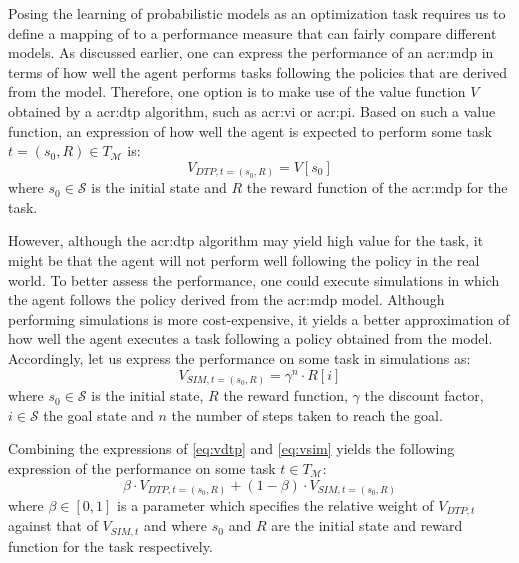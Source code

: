 Posing the learning of probabilistic models as an optimization task requires us to define a mapping of  to a performance measure that can fairly compare different models.
As discussed earlier, one can express the performance of an \acrshort{acr:mdp} in terms of how well the agent performs tasks following the policies that are derived from the model.
Therefore, one option is to make use of the value function $V$ obtained by a \acrshort{acr:dtp} algorithm, such as \acrshort{acr:vi} or \acrshort{acr:pi}.
Based on such a value function, an expression of how well the agent is expected to perform some task $t = (s_0, R) \in T_\mathcal{M}$ is:
\begin{equation}
\label{eq:vdtp}
V_{\mathit{DTP}, t=(s_0, R)} = V[s_0]
\end{equation}
where $s_0 \in \mathcal{S}$ is the initial state and $R$ the reward function of the \acrshort{acr:mdp} for the task.

However, although the \acrshort{acr:dtp} algorithm may yield high value for the task, it might be that the agent will not perform well following the policy in the real world.
To better assess the performance, one could execute simulations in which the agent follows the policy derived from the \acrshort{acr:mdp} model.
Although performing simulations is more cost-expensive, it yields a better approximation of how well the agent executes a task following a policy obtained from the model.
Accordingly, let us express the performance on some task in simulations as:
\begin{equation}
\label{eq:vsim}
V_{\mathit{SIM}, t=(s_0, R)} = \gamma^{n} \cdot R[i]
\end{equation}
where $s_0 \in \mathcal{S}$ is the initial state, $R$ the reward function, $\gamma$ the discount factor, $i \in \mathcal{S}$ the goal state and $n$ the number of steps taken to reach the goal.

Combining the expressions of \autoref{eq:vdtp} and \autoref{eq:vsim} yields the following expression of the performance on some task $t \in T_\mathcal{M}$:
\begin{equation}
\label{eq:vcom}
\beta \cdot V_{\mathit{DTP}, t=(s_0, R)} + (1 - \beta) \cdot V_{\mathit{SIM}, t=(s_0, R)}
\end{equation}
where $\beta \in [0, 1]$ is a parameter which specifies the relative weight of $V_{\mathit{DTP}, t}$ against that of $V_{\mathit{SIM}, t}$ and where $s_0$ and $R$ are the initial state and reward function for the task respectively.

